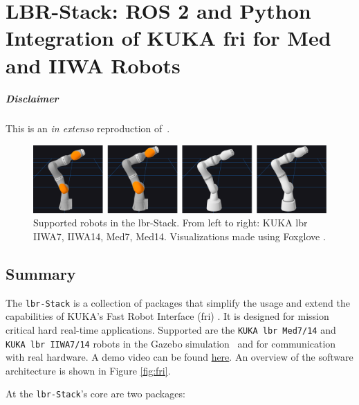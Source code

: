 \chapter[LBR-Stack]{LBR-Stack: ROS 2 and Python Integration of KUKA \gls{fri} for Med and
IIWA Robots}
\label{app:lbr_stack}
\minitoc

\paragraph{Disclaimer} This  is an \textit{in extenso} reproduction of~\cite{huber2023lbr}.

\newpage

\begin{figure}
\centering
\includegraphics[width=\textwidth]{appendix_a/img/joss_figure.png}
\caption[Supported robots in the \gls{lbr}-Stack. From left to right: KUKA \gls{lbr}
IIWA7, IIWA14, Med7, Med14. Visualizations made using Foxglove
.]{Supported robots in the \gls{lbr}-Stack. From left to right: KUKA \gls{lbr}
IIWA7, IIWA14, Med7, Med14. Visualizations made using Foxglove
\footnotemark{}.}
\end{figure}

\hypertarget{summary}{%
\section{Summary}\label{summary}}
The \texttt{\gls{lbr}-Stack} is a collection of packages that simplify the
usage and extend the capabilities of KUKA's Fast Robot Interface (\gls{fri})
\cite{ref-fri}. It is designed
for mission critical hard real-time applications. Supported are the
\texttt{KUKA\ \gls{lbr}\ Med7/14} and \texttt{KUKA\ \gls{lbr}\ IIWA7/14} robots in
the Gazebo simulation~\cite{ref-gazebo} and for communication with real hardware. A demo video can be
found
\href{https://www.linkedin.com/posts/mhubii_robotics-opensource-ros2-activity-7009974676017848320-S3U5/?utm_source=share\&utm_medium=member_desktop}{here}.
An overview of the software architecture is shown in Figure
\ref{fig:fri}.

At the \texttt{\gls{lbr}-Stack}'s core are two packages:


